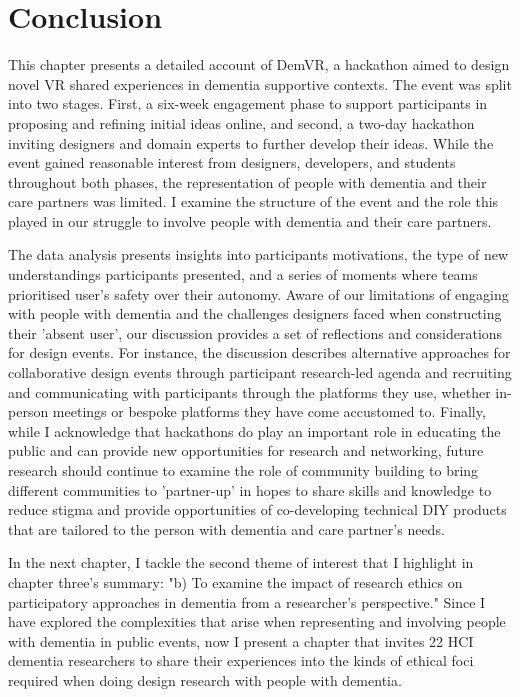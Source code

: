 \section{Conclusion}
\label{sec:Conclusion}
This chapter presents a detailed account of DemVR, a hackathon aimed to design novel VR shared experiences in dementia supportive contexts. The event was split into two stages. First, a six-week engagement phase to support participants in proposing and refining initial ideas online, and second, a two-day hackathon inviting designers and domain experts to further develop their ideas. While the event gained reasonable interest from designers, developers, and students throughout both phases, the representation of people with dementia and their care partners was limited. I examine the structure of the event and the role this played in our struggle to involve people with dementia and their care partners.

The data analysis presents insights into participants motivations, the type of new understandings participants presented, and a series of moments where teams prioritised user's safety over their autonomy. Aware of our limitations of engaging with people with dementia and the challenges designers faced when constructing their 'absent user', our discussion provides a set of reflections and considerations for design events. For instance, the discussion describes alternative approaches for collaborative design events through participant research-led agenda and recruiting and communicating with participants through the platforms they use, whether in-person meetings or bespoke platforms they have come accustomed to. Finally, while I acknowledge that hackathons do play an important role in educating the public and can provide new opportunities for research and networking, future research should continue to examine the role of community building to bring different communities to 'partner-up' in hopes to share skills and knowledge to reduce stigma and provide opportunities of co-developing technical DIY products that are tailored to the person with dementia and care partner's needs.

In the next chapter, I tackle the second theme of interest that I highlight in chapter three's summary: "b) To examine the impact of research ethics on participatory approaches in dementia from a researcher's perspective." Since I have explored the complexities that arise when representing and involving people with dementia in public events, now I present a chapter that invites 22 HCI dementia researchers to share their experiences into the kinds of ethical foci required when doing design research with people with dementia.
